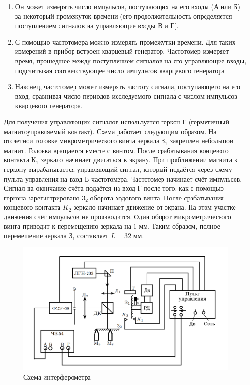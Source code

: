 \begin{enumerate}
    \item Он может измерять число импульсов, поступающих на его входы
    (А или Б) за некоторый промежуток времени (его продолжительность
    определяется поступлением сигналов на управляющие входы В и Г).

    \item С помощью частотомера можно измерять промежутки времени.
    Для таких измерений в прибор встроен кварцевый генератор. Частотомер измеряет время, прошедшее между поступлением сигналов на его
    управляющие входы, подсчитывая соответствующее число импульсов кварцевого генератора
    
    \item Наконец, частотомер может измерять частоту сигнала, поступающего на его вход, сравнивая число периодов исследуемого сигнала с
    числом импульсов кварцевого генератора.
\end{enumerate}


Для получения управляющих сигналов используется геркон $Г$ (герметичный магнитоуправляемый контакт). Схема работает следующим
образом. На отсчётной головке микрометрического винта зеркала $З_1$
закреплён небольшой магнит. Головка вращается вместе с винтом. После срабатывания концевого контакта $К_1$ зеркало начинает двигаться
к экрану. При приближении магнита к геркону вырабатывается управляющий сигнал, который подаётся через схему пульта управления на
вход В частотомера. Частотомер начинает счёт импульсов. Сигнал на
окончание счёта подаётся на вход $Г$ после того, как с помощью геркона зарегистрировано $3_2$ оборота ходового винта. После срабатывания
концевого контакта $K_2$ зеркало начинает движение от экрана. На этом
участке движения счёт импульсов не производится. Один оборот микрометрического винта приводит к перемещению зеркала на $1$ мм. Таким
образом, полное перемещение зеркала $З_1$ составляет $L = 32 \text{  мм}$.

\begin{figure}[h!]
    \centering
    \includegraphics[width=1.1\linewidth]{pics/lab_scheme.png}
    \caption{Схема интерферометра}
    \label{}
\end{figure}


